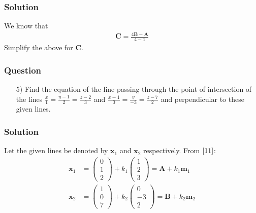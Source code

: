 \documentclass{beamer}
\theoremstyle{remark}
\newcommand{\myvec}[1]{\ensuremath{\begin{pmatrix}#1\end{pmatrix}}}
\let\vec\mathbf
\begin{document}
\begin{frame}
\frametitle{Solution}
We know that
\begin{align}
\vec{C} = \frac{4\vec{B}-\vec{A}}{4-1}
\end{align}
Simplify the above for $\vec{C}$. 
    
\end{frame}
%
\begin{frame}
\frametitle{Question }
\begin{enumerate}
    \item [5)]
Find the equation of the line passing through the point of intersection of the lines $\frac{x}{1} = \frac{y-1}{2} = \frac{z-2}{3}$ and $\frac{x-1}{0} = \frac{y}{-3} = \frac{z-7}{2}$ and perpendicular to these given lines. 
\end{enumerate}
\end{frame}
%
\begin{frame}
\frametitle{Solution}
Let the given lines be denoted by $\vec{x}_1$ and $\vec{x}_2$ respectively. From $\eqref{11}$:
\begin{align}
    \vec{x}_1 &= \myvec{
        0\\
        1\\
        2
    } + k_1\myvec{
        1\\
        2\\
        3
    } = \vec{A} + k_1\vec{m}_1 \label{12} \\
    \vec{x}_2 &= \myvec{
        1\\
        0\\
        7
    } + k_2\myvec{
        0\\
        -3\\
        2
    } = \vec{B} + k_2\vec{m}_2 \label{13}
\end{align}
\end{frame}
\end{document}
